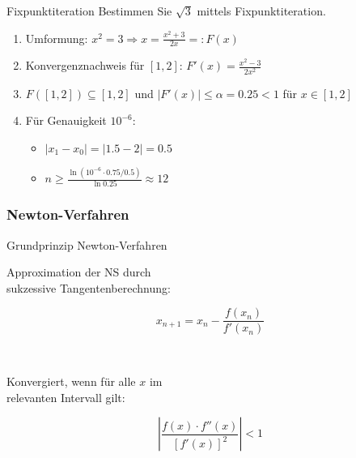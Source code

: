 \begin{example2}{Fixpunktiteration}
Bestimmen Sie $\sqrt{3}$ mittels Fixpunktiteration.
\begin{enumerate}
    \item Umformung: $x^2 = 3 \Rightarrow x = \frac{x^2+3}{2x} =: F(x)$
    
    \item Konvergenznachweis für $[1,2]$: $F'(x) = \frac{x^2-3}{2x^2}$

    \item $F([1,2]) \subseteq [1,2]$ und $|F'(x)| \leq \alpha = 0.25 < 1$ für $x \in [1,2]$
    
    \item Für Genauigkeit $10^{-6}$:
    \begin{itemize}
        \item $|x_1-x_0| = |1.5-2| = 0.5$
        \item $n \geq \frac{\ln(10^{-6} \cdot 0.75/0.5)}{\ln 0.25} \approx 12$
    \end{itemize}
\end{enumerate}
\end{example2}



\subsubsection{Newton-Verfahren}

\begin{concept}{Grundprinzip Newton-Verfahren}
    \vspace{-2mm}\\
\begin{minipage}[t]{0.6\textwidth}
    Approximation der NS durch \\ sukzessive Tangentenberechnung:
\end{minipage}
\begin{minipage}{0.3\textwidth}
    \vspace{-3mm}
    $$x_{n+1} = x_n - \frac{f(x_n)}{f'(x_n)}$$
\end{minipage}
\vspace{-2mm}\\
\begin{minipage}[t]{0.6\textwidth}
    Konvergiert, wenn für alle $x$ im \\ relevanten Intervall gilt:
\end{minipage}
\begin{minipage}{0.3\textwidth}
    \vspace{-3mm}
    $$\left|\frac{f(x) \cdot f''(x)}{[f'(x)]^2}\right| < 1$$
\end{minipage}
\end{concept}

